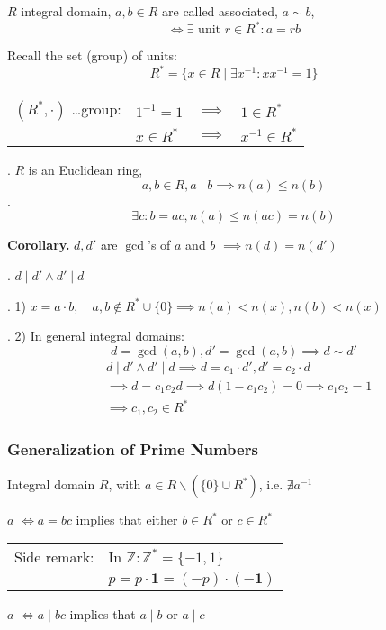 \begin{definition}
$R$ integral domain,
$a,b \in R$ are called associated, $a \sim b$,
\[
  \Leftrightarrow \exists \text{ unit } r \in R^{*}: a = rb
\]
\end{definition}

Recall the set (group) of units:
\[
  R^{*} = \{ x \in R \mid \exists x^{-1} : xx^{-1} = 1\}
\]
\begin{tabular}{llll}
  $(R^{*}, \cdot)$ \ldots group:
    & $1^{-1} = 1 $ & $\implies$ & $1 \in R^{*}$ \\
    & $x\in R^{*} $ & $\implies$ & $x^{-1} \in R^{*}$
\end{tabular}

\Theorem.
$R$ is an Euclidean ring, \[ a,b\in R, a∣b \implies n(a) \leq n(b) \]
\Proof.
\[
  \exists c : b = ac, n(a) \leq n(ac) = n(b)
\]

\textbf{Corollary.}
$d, d'$ are $\gcd$'s of $a$ and $b$ $\implies n(d) = n(d')$

\Proof.
$d∣d' \land d'∣d$


\Remark.
1) $x = a\cdot b, \quad a,b\not\in R^{*} \cup \{0\} \implies n(a) < n(x), n(b) < n(x)$

\Remark.
2) In general integral domains:
\[
  d= \gcd(a,b), d' = \gcd(a,b) \implies d \sim d'
\]
\begin{align*}
  &d∣d' \land d'∣d \implies d = c_1\cdot d', d' = c_2 \cdot d \\
  &\implies d = c_1c_2 d \implies d (1-c_1c_2) = 0 \implies c_1 c_2 = 1\\
  &\implies c_1,c_2 \in R^{*}
\end{align*}

\subsubsection{Generalization of Prime Numbers}
\begin{definition}
  Integral domain $R$, with $a\in R \backslash (\{0\}\cup R^{*})$, i.e. $\nexists a^{-1}$

$a$  $\Leftrightarrow a = bc$ implies that either $b\in R^{*}$ or $c\in R^{*}$

\begin{tabular}{ll}
   Side remark: & In $\mathbb{Z}: \mathbb{Z}^{*} = \{-1, 1\}$\\
   & $p = p \cdot \mathbf{1} = (-p) \cdot (\mathbf{-1})$
\end{tabular}

$a$  $\Leftrightarrow a ∣ bc$ implies that $a∣b$ or $a∣c$
\end{definition}

